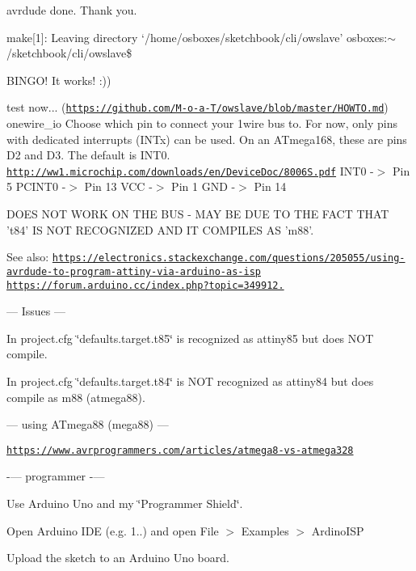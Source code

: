 avrdude done. Thank you.

make\mbox{[}1\mbox{]}\-: Leaving directory `/home/osboxes/sketchbook/cli/owslave' osboxes\-:$\sim$/sketchbook/cli/owslave\$

B\-I\-N\-G\-O! It works! \-:))

test now... (\href{https://github.com/M-o-a-T/owslave/blob/master/HOWTO.md}{\tt https\-://github.\-com/\-M-\/o-\/a-\/\-T/owslave/blob/master/\-H\-O\-W\-T\-O.\-md}) onewire\-\_\-io Choose which pin to connect your 1wire bus to. For now, only pins with dedicated interrupts (I\-N\-Tx) can be used. On an A\-Tmega168, these are pins D2 and D3. The default is I\-N\-T0. \href{http://ww1.microchip.com/downloads/en/DeviceDoc/8006S.pdf}{\tt http\-://ww1.\-microchip.\-com/downloads/en/\-Device\-Doc/8006\-S.\-pdf} I\-N\-T0 -\/$>$ Pin 5 P\-C\-I\-N\-T0 -\/$>$ Pin 13 V\-C\-C -\/$>$ Pin 1 G\-N\-D -\/$>$ Pin 14

D\-O\-E\-S N\-O\-T W\-O\-R\-K O\-N T\-H\-E B\-U\-S -\/ M\-A\-Y B\-E D\-U\-E T\-O T\-H\-E F\-A\-C\-T T\-H\-A\-T 't84' I\-S N\-O\-T R\-E\-C\-O\-G\-N\-I\-Z\-E\-D A\-N\-D I\-T C\-O\-M\-P\-I\-L\-E\-S A\-S 'm88'.

See also\-: \href{https://electronics.stackexchange.com/questions/205055/using-avrdude-to-program-attiny-via-arduino-as-isp}{\tt https\-://electronics.\-stackexchange.\-com/questions/205055/using-\/avrdude-\/to-\/program-\/attiny-\/via-\/arduino-\/as-\/isp} \href{https://forum.arduino.cc/index.php?topic=349912.0}{\tt https\-://forum.\-arduino.\-cc/index.\-php?topic=349912.}

--- Issues ---

In project.\-cfg \char`\"{}defaults.\-target.\-t85\char`\"{} is recognized as attiny85 but does N\-O\-T compile.

In project.\-cfg \char`\"{}defaults.\-target.\-t84\char`\"{} is N\-O\-T recognized as attiny84 but does compile as m88 (atmega88).

--- using A\-Tmega88 (mega88) ---

\href{https://www.avrprogrammers.com/articles/atmega8-vs-atmega328}{\tt https\-://www.\-avrprogrammers.\-com/articles/atmega8-\/vs-\/atmega328}

-\/--- programmer -\/---

Use Arduino Uno and my \char`\"{}\-Programmer Shield\char`\"{}.

Open Arduino I\-D\-E (e.\-g. 1..) and open File $>$ Examples $>$ Ardino\-I\-S\-P

Upload the sketch to an Arduino Uno board.


